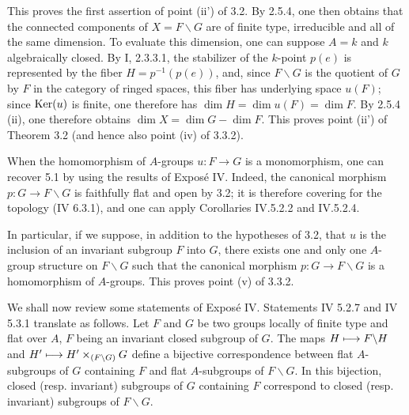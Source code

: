 This proves the first assertion of point (ii') of 3.2. By 2.5.4, one then obtains that the connected components of $X=F\backslash G$ are of finite type, irreducible and all of the same dimension. To evaluate this dimension, one can suppose $A=k$ and $k$ algebraically closed. By I, 2.3.3.1, the stabilizer of the $k$-point $p(e)$ is represented by the fiber $H=p^{-1}(p(e))$, and, since $F\backslash G$ is the quotient of $G$ by $F$ in the category of ringed spaces, this fiber has underlying space $u(F)$; since $\operatorname{Ker}(u)$ is finite, one therefore has $\dim H=\dim u(F)=\dim F$. By 2.5.4 (ii), one therefore obtains $\dim X=\dim G-\dim F$. This proves point (ii') of Theorem 3.2 (and hence also point (iv) of 3.3.2).

When the homomorphism of $A$-groups $u:F\to G$ is a monomorphism, one can recover 5.1 by using the results of Exposé IV. Indeed, the canonical morphism $p:G\to F\backslash G$ is faithfully flat and open by 3.2; it is therefore covering for the \fpqc topology (IV 6.3.1), and one can apply Corollaries IV.5.2.2 and IV.5.2.4.

In particular, if we suppose, in addition to the hypotheses of 3.2, that $u$ is the inclusion of an invariant subgroup $F$ into $G$, there exists one and only one $A$-group structure on $F\backslash G$ such that the canonical morphism $p:G\to F\backslash G$ is a homomorphism of $A$-groups. This proves point (v) of 3.3.2.

We shall now review some statements of Exposé IV.
Statements IV 5.2.7 and IV 5.3.1 translate as follows. Let $F$ and $G$ be two groups locally of finite type and flat over $A$, $F$ being an invariant closed subgroup of $G$. The maps $H\longmapsto F\backslash H$ and $H'\longmapsto H'\times_{(F\backslash G)}G$ define a bijective correspondence between flat $A$-subgroups of $G$ containing $F$ and flat $A$-subgroups of $F\backslash G$. In this bijection, closed (resp. invariant) subgroups of $G$ containing $F$ correspond to closed (resp. invariant) subgroups of $F\backslash G$.

